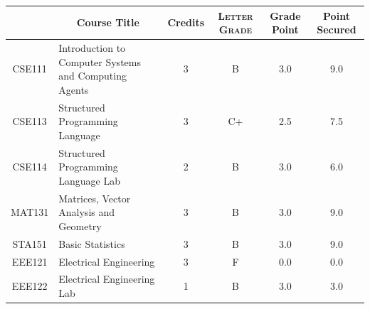 \documentclass[11pt]{article}
\newcommand*{\numtwo}[1]{\pgfmathprintnumber[
                    fixed, precision=2, fixed zerofill=true]{#1}}
\begin{document}
                \begin{center}
                    \renewcommand{\arraystretch}{1.08}
                    
                \begin{tabular}{|c|l|c|>{\scshape}c|c|c|}
                \hline  \rule[-1ex]{0pt}{3.5ex} {\centering{\bf Course Code}} &  \multicolumn{1}{c|}{\textbf{Course Title}}  & {\bf Credits} & {\bf Letter Grade} & {\bf Grade Point} & {\bf Point Secured}  \\ 
                \hline   CSE111 &  Introduction to Computer Systems and Computing Agents		 & 3 & B & 3.0 & 9.0 \\ %
                \hline   CSE113 &  Structured Programming Language		 & 3 & C+ & 2.5 & 7.5 \\ %
                \hline   CSE114 &  Structured Programming Language Lab		 & 2 & B & 3.0 & 6.0 \\ %
                \hline   MAT131 &  Matrices, Vector Analysis and Geometry		 & 3 & B & 3.0 & 9.0 \\ %
                \hline   STA151 &  Basic Statistics		 & 3 & B & 3.0 & 9.0 \\ %
                \hline   EEE121 &  Electrical Engineering		 & 3 & F & 0.0 & 0.0 \\ %
                \hline   EEE122 &  Electrical Engineering Lab		 & 1 & B & 3.0 & 3.0 \\ %

\hline                %
                \end{tabular}
                \end{center}
                \renewcommand{\arraystretch}{1.03}
\end{document}
